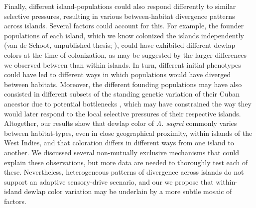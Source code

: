 Finally, different island-populations could also respond differently to similar selective pressures, resulting in various between-habitat divergence patterns across islands. Several factors could account for this. For example, the founder populations of each island, which we know colonized the islands independently (van de Schoot, unpublished thesis; \citealt{Driessens2017, Reynolds2020}), could have exhibited different dewlap colors at the time of colonization, as may be suggested by the larger differences we observed between than within islands. In turn, different initial phenotypes could have led to different ways in which populations would have diverged between habitats. Moreover, the different founding populations may have also consisted in different subsets of the standing genetic variation of their Cuban ancestor due to potential bottlenecks \citep{Reynolds2020}, which may have constrained the way they would later respond to the local selective pressures of their respective islands.\\

Altogether, our results show that dewlap color of \textit{A. sagrei} commonly varies between habitat-types, even in close geographical proximity, within islands of the West Indies, and that coloration differs in different ways from one island to another. We discussed several non-mutually exclusive mechanisms that could explain these observations, but more data are needed to thoroughly test each of these. Nevertheless, heterogeneous patterns of divergence across islands do not support an adaptive sensory-drive scenario, and our we propose that within-island dewlap color variation may be underlain by a more subtle mosaic of factors.

